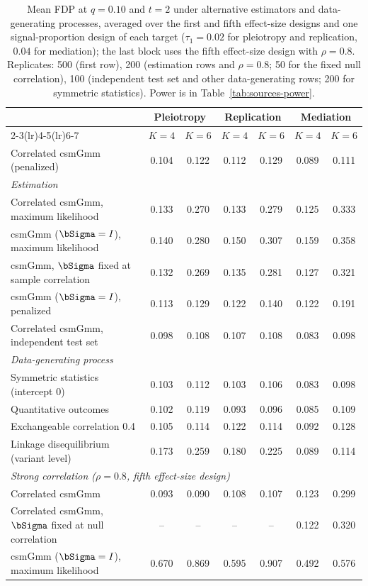 \begin{table}[!htbp]
\centering
\caption{Mean FDP at $q=0.10$ and $t=2$ under alternative estimators and data-generating processes, averaged over the first and fifth effect-size designs and one signal-proportion design of each target ($\tau_1=0.02$ for pleiotropy and replication, $0.04$ for mediation); the last block uses the fifth effect-size design with $\rho=0.8$. Replicates: 500 (first row), 200 (estimation rows and $\rho=0.8$; 50 for the fixed null correlation), 100 (independent test set and other data-generating rows; 200 for symmetric statistics). Power is in Table~\ref{tab:sources-power}.}\label{tab:sources-t2}
\small
\begin{tabular}{l cc cc cc}
\toprule
 & \multicolumn{2}{c}{Pleiotropy} & \multicolumn{2}{c}{Replication} & \multicolumn{2}{c}{Mediation}\\
\cmidrule(lr){2-3}\cmidrule(lr){4-5}\cmidrule(lr){6-7}
 & $K=4$ & $K=6$ & $K=4$ & $K=6$ & $K=4$ & $K=6$\\
\midrule
Correlated csmGmm (penalized) & 0.104 & 0.122 & 0.112 & 0.129 & 0.089 & 0.111\\
\multicolumn{7}{l}{\textit{Estimation}}\\
\quad Correlated csmGmm, maximum likelihood & 0.133 & 0.270 & 0.133 & 0.279 & 0.125 & 0.333\\
\quad csmGmm ($\bSigma=I$), maximum likelihood & 0.140 & 0.280 & 0.150 & 0.307 & 0.159 & 0.358\\
\quad csmGmm, $\bSigma$ fixed at sample correlation & 0.132 & 0.269 & 0.135 & 0.281 & 0.127 & 0.321\\
\quad csmGmm ($\bSigma=I$), penalized & 0.113 & 0.129 & 0.122 & 0.140 & 0.122 & 0.191\\
\quad Correlated csmGmm, independent test set & 0.098 & 0.108 & 0.107 & 0.108 & 0.083 & 0.098\\
\multicolumn{7}{l}{\textit{Data-generating process}}\\
\quad Symmetric statistics (intercept 0) & 0.103 & 0.112 & 0.103 & 0.106 & 0.083 & 0.098\\
\quad Quantitative outcomes & 0.102 & 0.119 & 0.093 & 0.096 & 0.085 & 0.109\\
\quad Exchangeable correlation 0.4 & 0.105 & 0.114 & 0.122 & 0.114 & 0.092 & 0.128\\
\quad Linkage disequilibrium (variant level) & 0.173 & 0.259 & 0.180 & 0.225 & 0.089 & 0.114\\
\multicolumn{7}{l}{\textit{Strong correlation ($\rho=0.8$, fifth effect-size design)}}\\
\quad Correlated csmGmm & 0.093 & 0.090 & 0.108 & 0.107 & 0.123 & 0.299\\
\quad Correlated csmGmm, $\bSigma$ fixed at null correlation & -- & -- & -- & -- & 0.122 & 0.320\\
\quad csmGmm ($\bSigma=I$), maximum likelihood & 0.670 & 0.869 & 0.595 & 0.907 & 0.492 & 0.576\\
\bottomrule
\end{tabular}
\end{table}
